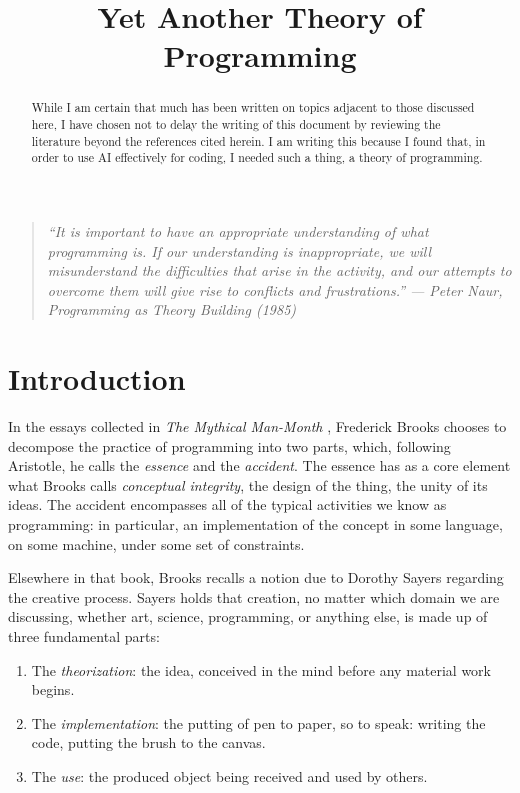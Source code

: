 \documentclass[12pt]{article}
\title{Yet Another Theory of Programming}
\author{}
\date{}
\theoremstyle{plain}
\theoremstyle{definition}
\theoremstyle{remark}
\begin{document}
\maketitle

\begin{quote}
\itshape
``It is important to have an appropriate understanding of what
programming is. If our understanding is inappropriate, we will
misunderstand the difficulties that arise in the activity, and our
attempts to overcome them will give rise to conflicts and
frustrations.''
\upshape
\hfill --- Peter Naur, \emph{Programming as Theory Building} (1985)
\end{quote}

\bigskip

\begin{abstract}
While I am certain that much has been written on topics adjacent to
those discussed here, I have chosen not to delay the writing of this
document by reviewing the literature beyond the references cited
herein. I am writing this because I found that, in order to use AI
effectively for coding, I needed such a thing, a theory of
programming.
\end{abstract}

\tableofcontents

\section{Introduction}

In the essays collected in \emph{The Mythical Man-Month}
\cite{brooks1995}, Frederick Brooks chooses to decompose the practice
of programming into two parts, which, following Aristotle, he calls
the \emph{essence} and the \emph{accident}. The essence has as a core
element what Brooks calls \emph{conceptual integrity}, the design of
the thing, the unity of its ideas. The accident encompasses all of
the typical activities we know as programming: in particular, an
implementation of the concept in some language, on some machine, under
some set of constraints.

Elsewhere in that book, Brooks recalls a notion due to Dorothy Sayers
\cite{sayers1941} regarding the creative process. Sayers holds that
creation, no matter which domain we are discussing, whether art,
science, programming, or anything else, is made up of three
fundamental parts:
\begin{enumerate}
  \item The \emph{theorization}: the idea, conceived in the mind
    before any material work begins.
  \item The \emph{implementation}: the putting of pen to paper, so to
    speak: writing the code, putting the brush to the canvas.
  \item The \emph{use}: the produced object being received and used by
    others.
\end{enumerate}
\end{document}
